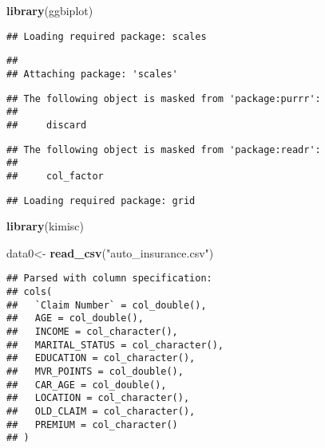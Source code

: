 \documentclass[]{article}
\newenvironment{Shaded}{\begin{snugshade}}{\end{snugshade}}
\newcommand{\KeywordTok}[1]{\textcolor[rgb]{0.13,0.29,0.53}{\textbf{#1}}}
\newcommand{\StringTok}[1]{\textcolor[rgb]{0.31,0.60,0.02}{#1}}
\newcommand{\NormalTok}[1]{#1}
\begin{document}
\begin{Shaded}
\begin{Highlighting}[]
\KeywordTok{library}\NormalTok{(ggbiplot)}
\end{Highlighting}
\end{Shaded}

\begin{verbatim}
## Loading required package: scales
\end{verbatim}

\begin{verbatim}
## 
## Attaching package: 'scales'
\end{verbatim}

\begin{verbatim}
## The following object is masked from 'package:purrr':
## 
##     discard
\end{verbatim}

\begin{verbatim}
## The following object is masked from 'package:readr':
## 
##     col_factor
\end{verbatim}

\begin{verbatim}
## Loading required package: grid
\end{verbatim}

\begin{Shaded}
\begin{Highlighting}[]
\KeywordTok{library}\NormalTok{(kimisc)}
\end{Highlighting}
\end{Shaded}

\begin{Shaded}
\begin{Highlighting}[]
\NormalTok{data0<-}\StringTok{ }\KeywordTok{read_csv}\NormalTok{(}\StringTok{"auto_insurance.csv"}\NormalTok{)}
\end{Highlighting}
\end{Shaded}

\begin{verbatim}
## Parsed with column specification:
## cols(
##   `Claim Number` = col_double(),
##   AGE = col_double(),
##   INCOME = col_character(),
##   MARITAL_STATUS = col_character(),
##   EDUCATION = col_character(),
##   MVR_POINTS = col_double(),
##   CAR_AGE = col_double(),
##   LOCATION = col_character(),
##   OLD_CLAIM = col_character(),
##   PREMIUM = col_character()
## )
\end{verbatim}
\end{document}
